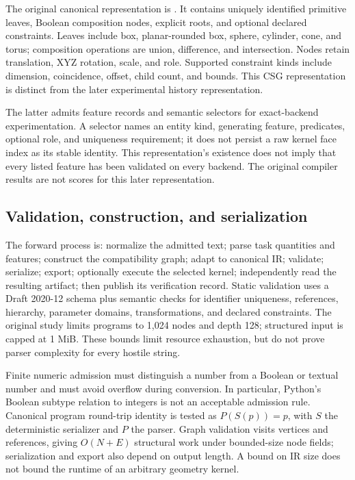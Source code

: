 \documentclass[10pt]{article}
\newcommand{\code}[1]{\texttt{\detokenize{#1}}}
\begin{document}
The original canonical representation is \code{neurocad-ir-v1}. It contains
uniquely identified primitive leaves, Boolean composition nodes, explicit
roots, and optional declared constraints. Leaves include box, planar-rounded
box, sphere, cylinder, cone, and torus; composition operations are union,
difference, and intersection. Nodes retain translation, XYZ rotation, scale,
and role. Supported constraint kinds include dimension, coincidence, offset,
child count, and bounds. This CSG representation is distinct from the later
experimental \code{neurocad-feature-ir-v0alpha1} history representation.

The latter admits feature records and semantic selectors for exact-backend
experimentation. A selector names an entity kind, generating feature,
predicates, optional role, and uniqueness requirement; it does not persist a
raw kernel face index as its stable identity. This representation's existence
does not imply that every listed feature has been validated on every backend.
The original compiler results are not scores for this later representation.

\subsection{Validation, construction, and serialization}

The forward process is: normalize the admitted text; parse task quantities and
features; construct the compatibility graph; adapt to canonical IR; validate;
serialize; export; optionally execute the selected kernel; independently read
the resulting artifact; then publish its verification record. Static validation
uses a Draft 2020-12 schema plus semantic checks for identifier uniqueness,
references, hierarchy, parameter domains, transformations, and declared
constraints. The original study limits programs to 1,024 nodes and depth 128;
structured input is capped at 1 MiB. These bounds limit resource exhaustion,
but do not prove parser complexity for every hostile string.

Finite numeric admission must distinguish a number from a Boolean or textual
number and must avoid overflow during conversion. In particular, Python's
Boolean subtype relation to integers is not an acceptable admission rule.
Canonical program round-trip identity is tested as \(P(S(p))=p\), with \(S\)
the deterministic serializer and \(P\) the parser. Graph validation visits
vertices and references, giving \(O(N+E)\) structural work under bounded-size
node fields; serialization and export also depend on output length. A bound
on IR size does not bound the runtime of an arbitrary geometry kernel.
\end{document}
